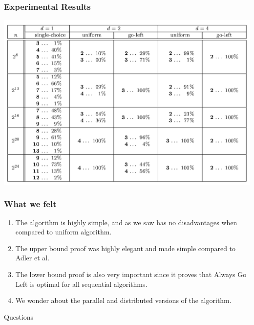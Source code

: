 \documentclass{beamer}
\begin{document}
\begin{frame}
\frametitle{Experimental Results}
\includegraphics[scale=0.20]{experiment.png}
\end{frame}

\begin{frame}
\frametitle{What we felt}
\begin{enumerate}
\item The algorithm is highly simple, and as we saw has no disadvantages when compared to uniform algorithm. 
 \item The upper bound proof was highly elegant and made simple compared to Adler et al. 
\item The lower bound proof is also very important since it proves that Always Go Left is optimal for all sequential algorithms. 
\item We wonder about the parallel and distributed versions of the algorithm. 
\end{enumerate}

\end{frame}

 
\begin{frame}
\centerline{Questions}
\end{frame}
\end{document}
